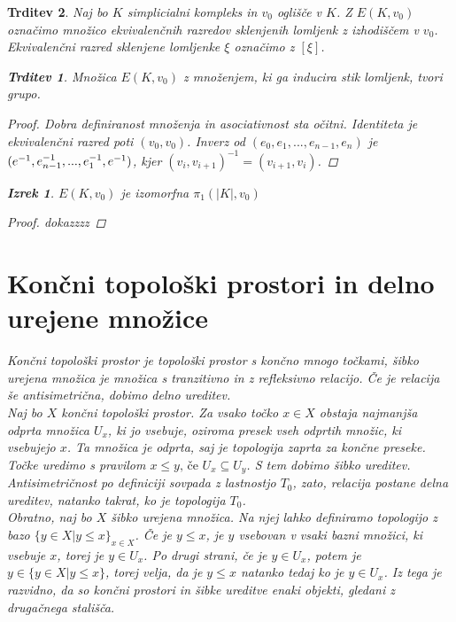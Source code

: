 \documentclass[a4paper,12pt]{article}
\theoremstyle{definition}
\theoremstyle{plain}
\newtheorem{izrek}{Izrek}
\theoremstyle{definition}
\theoremstyle{plain}
\newtheorem{trditev}{Trditev}
\theoremstyle{plain}
\theoremstyle{plain}
\theoremstyle{plain}
\begin{document}
\begin{trditev}
    Naj bo $K$ simplicialni kompleks in $v_0$ oglišče v $K$. Z $E(K,v_0)$ označimo množico ekvivalenčnih razredov sklenjenih lomljenk z izhodiščem v $v_0$. Ekvivalenčni razred sklenjene lomljenke $\xi$ označimo z $[\xi]$.

    \begin{trditev}
        Množica $E(K,v_0)$ z množenjem, ki ga inducira stik lomljenk, tvori grupo.
    \end{trditev}
\begin{proof}
    Dobra definiranost množenja in asociativnost sta očitni. 
    Identiteta je ekvivalenčni razred poti $(v_0,v_0)$. Inverz 
    od $(e_0,e_1,...,e_{n-1},e_n)$ je $(e^{-1},e^{-1}_{n-1},...,e^{-1}_1,
    
    \noindent e^{-1})$, kjer $(v_i,v_{i+1})^{-1}=(v_{i+1},v_i)$.
\end{proof}

\begin{izrek}
    \label{iz:grupa lomljenk}
$E(K,v_0)$ je izomorfna $\pi_1(|K|,v_0)$
\end{izrek}

\begin{proof}
    dokazzzz
\end{proof}
\section{Končni topološki prostori in delno urejene množice}

\textit{Končni topološki prostor} je topološki prostor s končno mnogo točkami, 
\textit{šibko urejena} množica je množica s tranzitivno in z refleksivno relacijo. Če je relacija še antisimetrična, dobimo \textit{delno} ureditev.
\\ \indent Naj bo $X$ končni topološki prostor. Za vsako točko $x \in X$ obstaja najmanjša odprta množica $U_x$, ki jo
vsebuje, oziroma presek vseh odprtih množic, ki vsebujejo $x$. Ta množica je odprta, saj je topologija zaprta za končne preseke.
    Točke uredimo s pravilom $ x\le y \text{, če } U_x \subseteq  U_y$. S tem dobimo šibko ureditev. 
    Antisimetričnost po definiciji sovpada z lastnostjo $T_0$, zato, relacija postane delna ureditev,
     natanko takrat, ko je topologija $T_0$.
    \\ \indent Obratno, naj bo $X$ šibko urejena množica. Na njej lahko definiramo topologijo z bazo $\{y \in X | y\le x\}_{x \in X}$. Če je
$y \le x$, je $y$ vsebovan v vsaki bazni množici, ki vsebuje $x$, torej je $y \in U_x$. Po drugi strani, če je $y\in
U_x$, potem je $y \in \{y \in X | y \le x\}$, torej velja, da je $y \le x$ natanko tedaj ko je $y \in U_x$. Iz tega je razvidno, da so končni prostori in šibke ureditve enaki objekti, gledani z drugačnega stališča.



\end{trditev}
\end{document}

